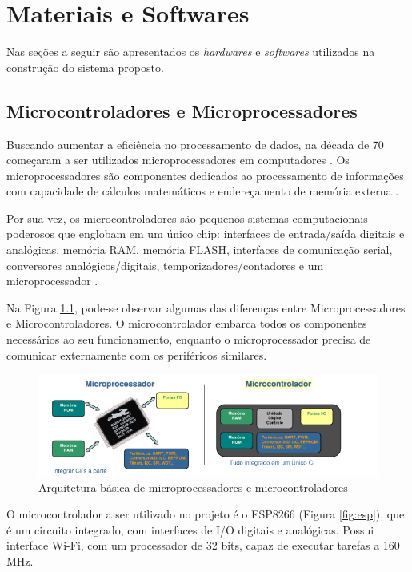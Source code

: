 \chapter{Materiais e Softwares}
Nas seções a seguir são apresentados os \textit{hardwares} e \textit{softwares} utilizados na construção do sistema proposto.
\section{Microcontroladores e Microprocessadores}

Buscando aumentar a eficiência no processamento de dados, na década de 70
começaram a ser utilizados microprocessadores em computadores \cite{martins2005sistemas}. Os microprocessadores são componentes dedicados ao processamento de informações com
capacidade de cálculos matemáticos e endereçamento de memória externa \cite{chase2007sistemas}.

Por sua vez, os microcontroladores são pequenos sistemas computacionais poderosos que englobam em um único chip: interfaces de entrada/saída digitais e analógicas, memória RAM, memória FLASH, interfaces de comunicação serial, conversores analógicos/digitais, temporizadores/contadores e um microprocessador \cite{chase2007sistemas}.

Na Figura \ref{fig:microprocessador-microcontrolador}, pode-se observar algumas das diferenças entre Microprocessadores e Microcontroladores. O microcontrolador embarca todos os componentes necessários ao seu funcionamento, enquanto o microprocessador precisa de comunicar externamente com os periféricos similares.

\begin{figure}[htbp]
	\centering
	\includegraphics[scale=0.7]{figuras/processa-controla.png}
	\caption{Arquitetura básica de microprocessadores e microcontroladores}
	\label{fig:microprocessador-microcontrolador}
\end{figure}

\newpage

O microcontrolador a ser utilizado no projeto é o ESP8266 (Figura \ref{fig:esp}), que é um circuito integrado, com interfaces de I/O digitais e analógicas. Possui interface Wi-Fi, com um processador de 32 bits, capaz de executar tarefas a 160 MHz.

